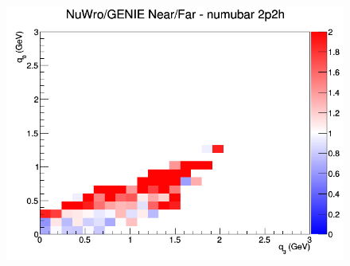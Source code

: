 \begin{figure}[h]
\endminipage
{}
\includegraphics[width=\linewidth]{eff_q0_q3/GAr/ratios/2p2h_NuWro_GENIE_numubar_NF_q3_q0.png}
\endminipage
\newline
\end{figure}
\clearpage
